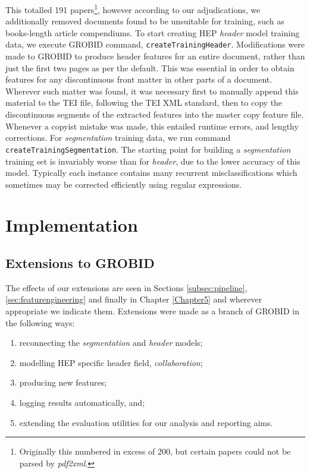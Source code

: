 This totalled 191 papers\footnote{Originally this numbered in excess of 200, but certain papers could not be parsed by \emph{pdf2xml}.}, however according to our adjudications, we additionally removed documents found to be unsuitable for training, such as books-length article compendiums. To start creating HEP \emph{header} model training data, we execute GROBID command, \texttt{createTrainingHeader}. Modifications were made to GROBID to produce header features for an entire document, rather than just the first two pages as per the default. This was essential in order to obtain features for any discontinuous front matter in other parts of a document. Wherever such matter was found, it was necessary first to manually append this material to the TEI file, following the TEI XML standard, then to copy the discontinuous segments of the extracted features into the master copy feature file. Whenever a copyist mistake was made, this entailed runtime errors, and lengthy corrections. For \emph{segmentation} training data, we run command \texttt{createTrainingSegmentation}. The starting point for building a \emph{segmentation} training set is invariably worse than for \emph{header}, due to the lower accuracy of this model. Typically each instance contains many recurrent misclassifications which sometimes may be corrected efficiently using regular expressions.


\section{Implementation}
\subsection{Extensions to GROBID}

The effects of our extensions are seen in Sections \ref{subsec:pipeline}, \ref{sec:featurengineering} and finally in Chapter \ref{Chapter5} and wherever appropriate we indicate them. Extensions were made as a branch of GROBID in the following ways:

\begin{enumerate}
\item reconnecting the \emph{segmentation} and \emph{header} models;
\item modelling HEP specific header field, \emph{collaboration};
\item producing new features;
\item logging results automatically, and;
\item extending the evaluation utilities for our analysis and reporting aims.
\end{enumerate}

